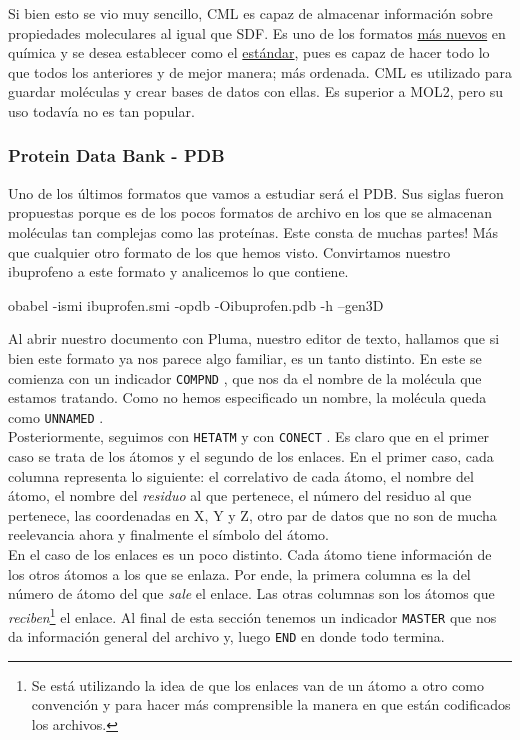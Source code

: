 \documentclass[10pt,letterpaper]{article}
\newcommand{\inlinecode}[1]{
\colorbox{light-gray}{\texttt{#1}}
}
\newenvironment{Code}
{
\begin{lrbox}{\selvestebox}%
\begin{minipage}{\dimexpr\columnwidth-2\fboxsep\relax}
\fontfamily{\ttdefault}\selectfont
}
{\end{minipage}\end{lrbox}%
\begin{center}
\colorbox{light-gray}{\usebox{\selvestebox}}
\end{center}
}
\begin{document}
Si bien esto se vio muy sencillo, CML es capaz de almacenar informaci\'on sobre propiedades moleculares al igual que SDF. Es uno de los formatos \href{https://jcheminf.springeropen.com/articles/10.1186/1758-2946-3-44}{m\'as nuevos} en qu\'imica y se desea establecer como el \href{http://www.xml-cml.org/}{est\'andar}, pues es capaz de hacer todo lo que todos los anteriores y de mejor manera; m\'as ordenada. CML es utilizado para guardar mol\'eculas y crear bases de datos con ellas. Es superior a MOL2, pero su uso todav\'ia no es tan popular.

\subsubsection{Protein Data Bank - PDB}
Uno de los \'ultimos formatos que vamos a estudiar ser\'a el PDB. Sus siglas fueron propuestas porque es de los pocos formatos de archivo en los que se almacenan mol\'eculas tan complejas como las prote\'inas. Este consta de muchas partes! M\'as que cualquier otro formato de los que hemos visto. Convirtamos nuestro ibuprofeno a este formato y analicemos lo que contiene.

\begin{Code}
obabel -ismi ibuprofen.smi -opdb -Oibuprofen.pdb -h --gen3D
\end{Code}

Al abrir nuestro documento con Pluma, nuestro editor de texto, hallamos que si bien este formato ya nos parece algo familiar, es un tanto distinto. En este se comienza con un indicador \inlinecode{COMPND}, que nos da el nombre de la mol\'ecula que estamos tratando. Como no hemos especificado un nombre, la mol\'ecula queda como \inlinecode{UNNAMED}.\\

Posteriormente, seguimos con \inlinecode{HETATM} y con \inlinecode{CONECT}. Es claro que en el primer caso se trata de los \'atomos y el segundo de los enlaces. En el primer caso, cada columna representa lo siguiente: el correlativo de cada \'atomo, el nombre del \'atomo, el nombre del \emph{residuo} al que pertenece, el n\'umero del residuo al que pertenece, las coordenadas en X, Y y Z, otro par de datos que no son de mucha reelevancia ahora y finalmente el s\'imbolo del \'atomo.\\

En el caso de los enlaces es un poco distinto. Cada \'atomo tiene informaci\'on de los otros \'atomos a los que se enlaza. Por ende, la primera columna es la del n\'umero de \'atomo del que \emph{sale} el enlace. Las otras columnas son los \'atomos que \emph{reciben}\footnote{Se est\'a utilizando la idea de que los enlaces van de un \'atomo a otro como convenci\'on y para hacer m\'as comprensible la manera en que est\'an codificados los archivos.} el enlace. Al final de esta secci\'on tenemos un indicador \inlinecode{MASTER} que nos da informaci\'on general del archivo y, luego \inlinecode{END} en donde todo termina.\\
\end{document}
